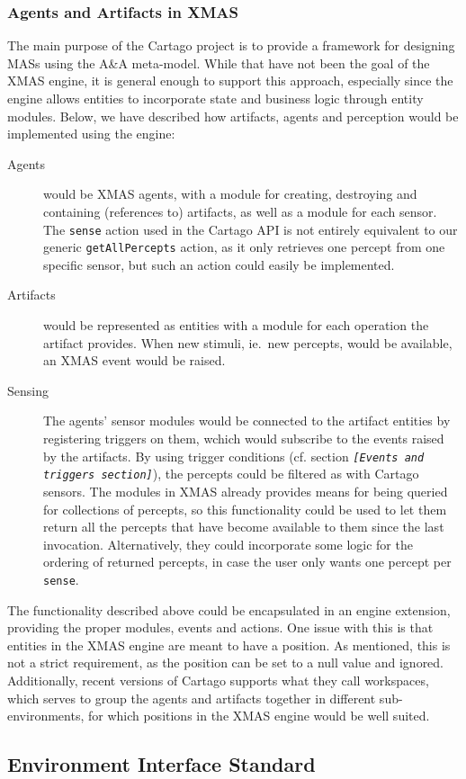 \subsubsection*{Agents and Artifacts in XMAS}

The main purpose of the Cartago project is to provide a framework
for designing MASs using the A\&A meta-model. While that have not
been the goal of the XMAS engine, it is general enough to support
this approach, especially since the engine allows entities to incorporate
state and business logic through entity modules. Below, we have described
how artifacts, agents and perception would be implemented using the
engine:
\begin{description}
\item [{Agents}] would be XMAS agents, with a module for creating, destroying
and containing (references to) artifacts, as well as a module for
each sensor. The \texttt{sense} action used in the Cartago API is
not entirely equivalent to our generic \texttt{getAllPercepts} action,
as it only retrieves one percept from one specific sensor, but such
an action could easily be implemented. 
\item [{Artifacts}] would be represented as entities with a module for
each operation the artifact provides. When new stimuli, ie.\ new
percepts, would be available, an XMAS event would be raised.
\item [{Sensing}] The agents' sensor modules would be connected to the
artifact entities by registering triggers on them, wchich would subscribe
to the events raised by the artifacts. By using trigger conditions
(cf. section \texttt{\emph{{[}Events and triggers section{]}}}), the
percepts could be filtered as with Cartago sensors. The modules in
XMAS already provides means for being queried for collections of percepts,
so this functionality could be used to let them return all the percepts
that have become available to them since the last invocation. Alternatively,
they could incorporate some logic for the ordering of returned percepts,
in case the user only wants one percept per \texttt{sense}.
\end{description}
The functionality described above could be encapsulated in an engine
extension, providing the proper modules, events and actions. One issue
with this is that entities in the XMAS engine are meant to have a
position. As mentioned, this is not a strict requirement, as the position
can be set to a null value and ignored. Additionally, recent versions
of Cartago supports what they call workspaces, which serves to group
the agents and artifacts together in different sub-environments, for
which positions in the XMAS engine would be well suited.


\subsection{Environment Interface Standard}


\subsubsection*{}
